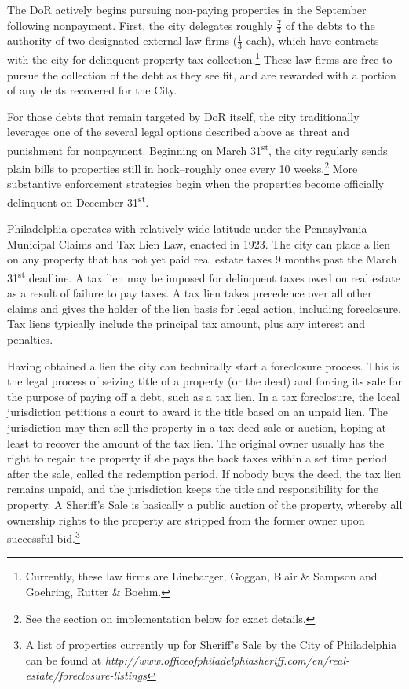 \documentclass[12pt,titlepage]{article}
\begin{document}
The DoR actively begins pursuing non-paying properties in the
September following nonpayment.  First, the city delegates roughly
$\frac{2}{3}$ of the debts to the authority of two designated external
law firms ($\frac{1}{3}$ each), which have contracts with the city for delinquent property
tax collection.\footnote{Currently, these law firms are Linebarger,
  Goggan, Blair \& Sampson and Goehring, Rutter \& Boehm.} These law
firms are free to pursue the collection of the debt as they see fit,
and are rewarded with a portion of any debts recovered for the City.

For those debts that remain targeted by DoR itself, the city
traditionally leverages one of the several legal options
described above as threat and punishment for nonpayment.
Beginning on March 31\textsuperscript{st}, the city regularly
sends plain bills to properties still in hock--roughly once every 10
weeks.\footnote{See the section on implementation below for exact
  details.} More substantive enforcement strategies begin when
the properties become officially delinquent on December 31\textsuperscript{st}.

Philadelphia operates with relatively wide latitude under the
Pennsylvania Municipal Claims and Tax Lien Law, enacted in 1923. The
city can place a lien on any property that has not yet paid real estate
taxes 9 months past the March 31\textsuperscript{st} deadline. A tax lien may be imposed
for delinquent taxes owed on real estate as a result of failure to
pay taxes.  A tax lien takes precedence over all other claims and
gives the holder of the lien basis for legal action, including
foreclosure.  Tax liens typically include the principal tax amount,
plus any interest and penalties.

Having obtained a lien the city can technically start a foreclosure
process. This is the legal process of seizing title of a property (or
the deed) and forcing its sale for the purpose of paying off a debt,
such as a tax lien. In a tax foreclosure, the local jurisdiction
petitions a court to award it the title based on an unpaid lien. The
jurisdiction may then sell the property in a tax-deed sale or auction,
hoping at least to recover the amount of the tax lien. The original
owner usually has the right to regain the property if she pays the
back taxes within a set time period after the sale, called the
redemption period. If nobody buys the deed, the tax lien remains
unpaid, and the jurisdiction keeps the title and responsibility for
the property. A Sheriff's Sale is basically a public auction of the
property, whereby all ownership rights to the property are stripped
from the former owner upon successful bid.\footnote{A list of
  properties currently up for Sheriff's Sale by the City of
  Philadelphia can be found at
  \it{http://www.officeofphiladelphiasheriff.com/en/real-estate/foreclosure-listings}}
\end{document}
